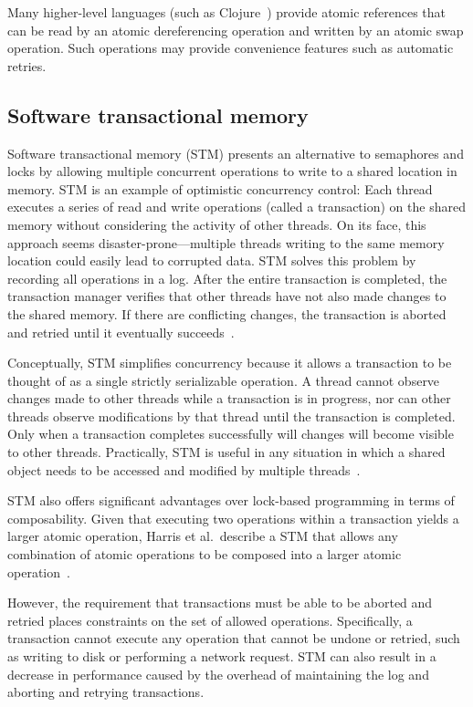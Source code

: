 \documentclass{sig-alternate}
\begin{document}
Many higher-level languages (such as Clojure~\cite{Swalens2014}) provide atomic references that can be read by an atomic dereferencing operation and written by an atomic swap operation. Such operations may provide convenience features such as automatic retries.

\subsection{Software transactional memory}

Software transactional memory (STM) presents an alternative to semaphores and locks by allowing multiple concurrent operations to write to a shared location in memory. STM is an example of optimistic concurrency control: Each thread executes a series of read and write operations (called a transaction) on the shared memory without considering the activity of other threads. On its face, this approach seems disaster-prone---multiple threads writing to the same memory location could easily lead to corrupted data. STM solves this problem by recording all operations in a log. After the entire transaction is completed, the transaction manager verifies that other threads have not also made changes to the shared memory. If there are conflicting changes, the transaction is aborted and retried until it eventually succeeds~\cite{Shavit1995}.

Conceptually, STM simplifies concurrency because it allows a transaction to be thought of as a single strictly serializable operation. A thread cannot observe changes made to other threads while a transaction is in progress, nor can other threads observe modifications by that thread until the transaction is completed. Only when a transaction completes successfully will changes will become visible to other threads. Practically, STM is useful in any situation in which a shared object needs to be accessed and modified by multiple threads~\cite{Swalens2014}.

STM also offers significant advantages over lock-based programming in terms of composability. Given that executing two operations within a transaction yields a larger atomic operation, Harris et al.\ describe a STM that allows any combination of atomic operations to be composed into a larger atomic operation~\cite{Harris2005}.

However, the requirement that transactions must be able to be aborted and retried places constraints on the set of allowed operations. Specifically, a transaction cannot execute any operation that cannot be undone or retried, such as writing to disk or performing a network request. STM can also result in a decrease in performance caused by the overhead of maintaining the log and aborting and retrying transactions.
\end{document}
